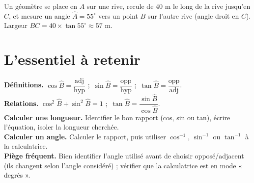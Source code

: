 \begin{illus}
\end{illus}

\begin{exemple}
Un géomètre se place en $A$ sur une rive, recule de $40$ m le long de la rive jusqu'en $C$,
et mesure un angle $\widehat A=55^{\circ}$ vers un point $B$ sur l'autre rive (angle droit
en $C$). Largeur $BC=40\times\tan55^{\circ}\approx57$ m.
\end{exemple}

\section{L'essentiel à retenir}

\begin{synthese}
\textbf{Définitions.} $\cos\widehat B=\dfrac{\text{adj}}{\text{hyp}}$ ;\
$\sin\widehat B=\dfrac{\text{opp}}{\text{hyp}}$ ;\ $\tan\widehat B=\dfrac{\text{opp}}{\text{adj}}$.\\[4pt]
\textbf{Relations.} $\cos^{2}\widehat B+\sin^{2}\widehat B=1$ ;\
$\tan\widehat B=\dfrac{\sin\widehat B}{\cos\widehat B}$.\\[4pt]
\textbf{Calculer une longueur.} Identifier le bon rapport (cos, sin ou tan), écrire
l'équation, isoler la longueur cherchée.\\[4pt]
\textbf{Calculer un angle.} Calculer le rapport, puis utiliser $\cos^{-1}$, $\sin^{-1}$ ou
$\tan^{-1}$ à la calculatrice.\\[4pt]
\textbf{Piège fréquent.} Bien identifier l'angle utilisé avant de choisir opposé/adjacent
(ils changent selon l'angle considéré) ; vérifier que la calculatrice est en mode «
degrés ».
\end{synthese}

